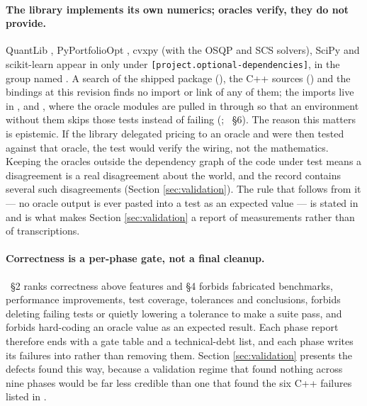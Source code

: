 \documentclass[11pt,a4paper]{article}
\begin{document}
\paragraph{The library implements its own numerics; oracles verify, they do not provide.}
QuantLib \citep{quantlib}, PyPortfolioOpt \citep{pyportfolioopt}, cvxpy \citep{cvxpy}
(with the OSQP and SCS solvers), SciPy \citep{scipy2020} and scikit-learn
\citep{sklearn2011} appear in  only under
\texttt{[project.optional-dependencies]}, in the group named . A search of
the shipped package (), the C++ sources () and the
bindings at this revision finds no import or link of any of them; the imports live in
,  and ,
where the oracle modules are pulled in through  so that an
environment without them skips those tests instead of failing
(; ~\S6). The reason this matters is
epistemic. If the library delegated pricing to an oracle and were then tested against that
oracle, the test would verify the wiring, not the mathematics. Keeping the oracles outside
the dependency graph of the code under test means a disagreement is a real disagreement
about the world, and the record contains several such disagreements
(Section \ref{sec:validation}). The rule that follows from it --- no oracle output is ever
pasted into a test as an expected value --- is stated in 
and is what makes Section \ref{sec:validation} a report of measurements rather than of
transcriptions.

\paragraph{Correctness is a per-phase gate, not a final cleanup.}
~\S2 ranks correctness above features and \S4 forbids fabricated
benchmarks, performance improvements, test coverage, tolerances and conclusions, forbids
deleting failing tests or quietly lowering a tolerance to make a suite pass, and forbids
hard-coding an oracle value as an expected result. Each phase report therefore ends with a
gate table and a technical-debt list, and each phase writes its failures into
 rather than removing them. Section \ref{sec:validation} presents
the defects found this way, because a validation regime that found nothing across nine
phases would be far less credible than one that found the six C++ failures listed in
.
\end{document}
